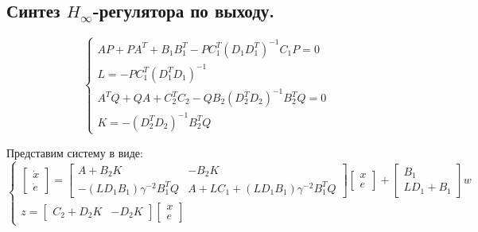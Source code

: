 \subsection{Синтез \(H_\infty\)-регулятора по выходу.}
\begin{equation}
    \begin{cases}
        AP + PA^T + B_1B_1^T - PC_1^T(D_1D_1^T)^{-1}C_1P = 0 \\
        L = - PC_1^T(D_1^TD_1)^{-1} \\
        A^TQ + QA + C_2^TC_2 - QB_2(D_2^TD_2)^{-1}B_2^TQ = 0 \\
        K = -(D_2^TD_2)^{-1}B_2^TQ
    \end{cases}
\end{equation}

Представим систему в виде:
\begin{equation}
    \begin{cases}
        \begin{bmatrix}
            \dot{x} \\ \dot{e}
        \end{bmatrix} =
        \begin{bmatrix}
            A + B_2K & -B_2K \\
            -(LD_1B_1)\gamma^{-2}B_1^TQ & A + LC_1 + (LD_1B_1)\gamma^{-2}B_1^TQ
        \end{bmatrix} \begin{bmatrix}
            x \\ e
        \end{bmatrix} +
        \begin{bmatrix}
            B_1 \\
            LD_1 + B_1
        \end{bmatrix}w \\
        z = \begin{bmatrix}
            C_2 +D_2K & -D_2K
        \end{bmatrix}\begin{bmatrix}
            x \\ e
        \end{bmatrix}
    \end{cases}
\end{equation}



